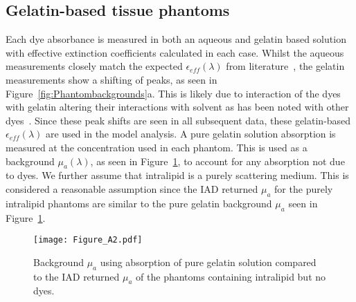 
\subsection{Gelatin-based tissue phantoms}\label{sec:resultsPhantoms}
Each dye absorbance is measured in both an aqueous and gelatin based solution with effective extinction coefficients calculated in each case. Whilst the aqueous measurements closely match the expected $\epsilon_{eff}(\lambda)$ from literature~\citep{PhotochemCAD}, the gelatin measurements show a shifting of peaks, as seen in Figure~\ref{fig:Phantombackgrounds}a. This is likely due to interaction of the dyes with gelatin altering their interactions with solvent as has been noted with other dyes~\citep{Cook2011}.
Since these peak shifts are seen in all subsequent data, these gelatin-based $\epsilon_{eff}(\lambda)$ are used in the model analysis. A pure gelatin solution absorption is measured at the concentration used in each phantom. This is used as a background $\mu_a(\lambda)$, as seen in Figure~\ref{fig:muaback}, to account for any absorption not due to dyes.
We further assume that intralipid is a purely scattering medium. This is considered a reasonable assumption since the IAD returned $\mu_a$ for the purely intralipid phantoms are similar to the pure gelatin background $\mu_a$ seen in Figure~\ref{fig:muaback}.

\begin{figure}[htb!]
    \centering
    \texttt{[image: Figure\_A2.pdf]}
    \caption{Background $\mu_a$ using absorption of pure gelatin solution compared to the IAD returned $\mu_a$ of the phantoms containing intralipid but no dyes.}
 \label{fig:muaback}
\end{figure}

